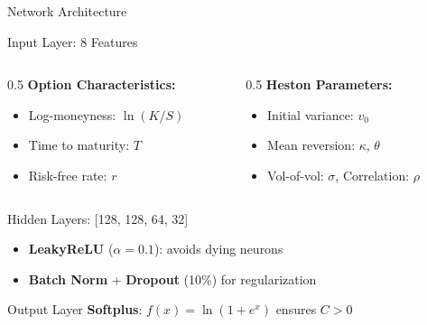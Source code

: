 \documentclass{beamer}
\begin{document}
\begin{frame}{Network Architecture}
    \begin{block}{Input Layer: 8 Features}
        \begin{columns}
            \begin{column}{0.5\textwidth}
                \textbf{Option Characteristics:}
                \begin{itemize}
                    \item Log-moneyness: $\ln(K/S)$
                    \item Time to maturity: $T$
                    \item Risk-free rate: $r$
                \end{itemize}
            \end{column}
            \begin{column}{0.5\textwidth}
                \textbf{Heston Parameters:}
                \begin{itemize}
                    \item Initial variance: $v_0$
                    \item Mean reversion: $\kappa$, $\theta$
                    \item Vol-of-vol: $\sigma$, Correlation: $\rho$
                \end{itemize}
            \end{column}
        \end{columns}
    \end{block}

    \begin{block}{Hidden Layers: [128, 128, 64, 32]}
        \begin{itemize}
            \item \textbf{LeakyReLU} ($\alpha=0.1$): avoids dying neurons
            \item \textbf{Batch Norm} + \textbf{Dropout} (10\%) for regularization
        \end{itemize}
    \end{block}

    \begin{alertblock}{Output Layer}
        \textbf{Softplus}: $f(x) = \ln(1 + e^x)$ ensures $C > 0$
    \end{alertblock}
\end{frame}
\end{document}
